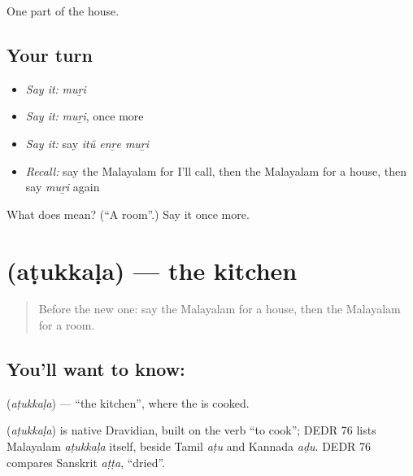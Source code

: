 \begin{grammarlens}[title={What you've built}]
One part of the house.
\end{grammarlens}

\subsection*{Your turn}
\begin{itemize}
\raggedright
  \item \emph{Say it:} \emph{muṟi}
  \item \emph{Say it:} \emph{muṟi}, once more
  \item \emph{Say it:} say \emph{itŭ enṟe muṟi}
  \item \emph{Recall:} say the Malayalam for I'll call, then the Malayalam for a house, then say \emph{muṟi} again
\end{itemize}

\begin{tcolorbox}[breakable,colback=teal!4,colframe=teal!35!black,title={Before you move on}]
What does  mean? (\textquotedblleft{}A room\textquotedblright{}.) Say it once more.
\end{tcolorbox}
\section[\texorpdfstring{\ml{അടുക്കള} (aṭukkaḷa)}{അടുക്കള (aṭukkaḷa)}]{ (aṭukkaḷa) — the kitchen}

\label{lesson:ML-C128-kitchen}



\begin{quote}
Before the new one: say the Malayalam for a house, then the Malayalam for a room.
\end{quote}

\subsection*{You'll want to know: }
\textbf{} (\emph{aṭukkaḷa}) — \textquotedblleft{}the kitchen\textquotedblright{}, where the \textbf{} is cooked.

\begin{cousinweb}
\textbf{} (\emph{aṭukkaḷa}) is native Dravidian, built on the verb \textquotedblleft{}to cook\textquotedblright{}; DEDR 76 lists Malayalam \emph{aṭukkaḷa} itself, beside Tamil \emph{aṭu} and Kannada \emph{aḍu}. DEDR 76 compares Sanskrit \emph{aṭṭa}, \textquotedblleft{}dried\textquotedblright{}.
\end{cousinweb}

